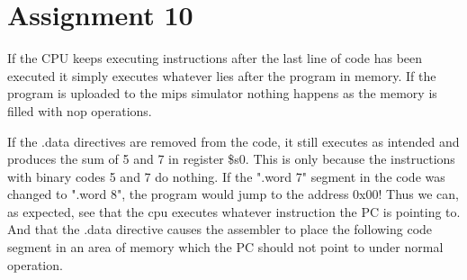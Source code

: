 \section{Assignment 10 }
If the CPU keeps executing instructions after the last line of code has been executed it simply
executes whatever lies after the program in memory. If the program is uploaded to the mips simulator
nothing happens as the memory is filled with nop operations. 

If the .data directives are removed from the code, it still executes as intended and produces the sum
of 5 and 7 in register \$s0. This is only because the instructions with binary codes 5 and 7 do nothing.
If the ".word 7" segment in the code was changed to ".word 8", the program would jump to the address 0x00!
Thus we can, as expected, see that the cpu executes whatever instruction the PC is pointing to. And that the
.data directive causes the assembler to place the following code segment in an area of memory which the PC
should not point to under normal operation.
